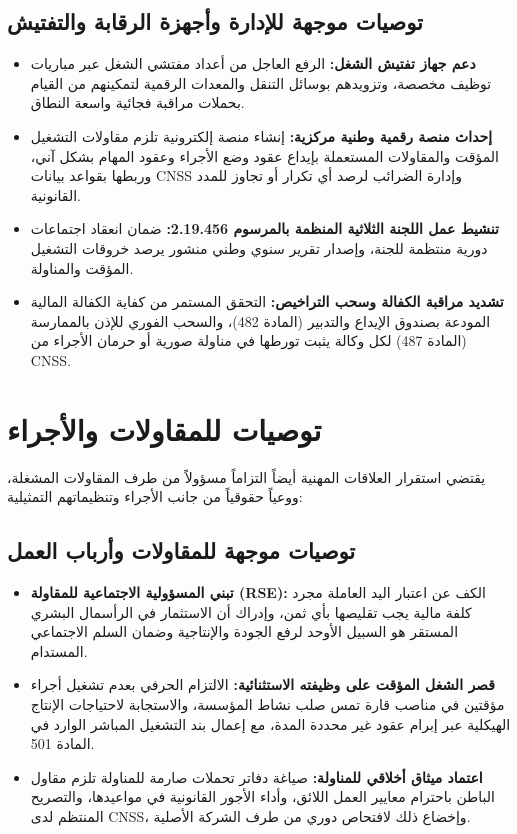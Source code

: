 \subsection{توصيات موجهة للإدارة وأجهزة الرقابة والتفتيش}
\begin{itemize}[leftmargin=*, itemsep=6pt]
    \item \textbf{دعم جهاز تفتيش الشغل:} الرفع العاجل من أعداد مفتشي الشغل عبر مباريات توظيف مخصصة، وتزويدهم بوسائل التنقل والمعدات الرقمية لتمكينهم من القيام بحملات مراقبة فجائية واسعة النطاق.
    \item \textbf{إحداث منصة رقمية وطنية مركزية:} إنشاء منصة إلكترونية تلزم مقاولات التشغيل المؤقت والمقاولات المستعملة بإيداع عقود وضع الأجراء وعقود المهام بشكل آني، وربطها بقواعد بيانات \textenglish{CNSS} وإدارة الضرائب لرصد أي تكرار أو تجاوز للمدد القانونية.
    \item \textbf{تنشيط عمل اللجنة الثلاثية المنظمة بالمرسوم \textenglish{2.19.456}:} ضمان انعقاد اجتماعات دورية منتظمة للجنة، وإصدار تقرير سنوي وطني منشور يرصد خروقات التشغيل المؤقت والمناولة.
    \item \textbf{تشديد مراقبة الكفالة وسحب التراخيص:} التحقق المستمر من كفاية الكفالة المالية المودعة بصندوق الإيداع والتدبير (المادة \textenglish{482})، والسحب الفوري للإذن بالممارسة (المادة \textenglish{487}) لكل وكالة يثبت تورطها في مناولة صورية أو حرمان الأجراء من \textenglish{CNSS}.
\end{itemize}

\section{توصيات للمقاولات والأجراء}

يقتضي استقرار العلاقات المهنية أيضاً التزاماً مسؤولاً من طرف المقاولات المشغلة، ووعياً حقوقياً من جانب الأجراء وتنظيماتهم التمثيلية:

\subsection{توصيات موجهة للمقاولات وأرباب العمل}
\begin{itemize}[leftmargin=*, itemsep=6pt]
    \item \textbf{تبني المسؤولية الاجتماعية للمقاولة (\textenglish{RSE}):} الكف عن اعتبار اليد العاملة مجرد كلفة مالية يجب تقليصها بأي ثمن، وإدراك أن الاستثمار في الرأسمال البشري المستقر هو السبيل الأوحد لرفع الجودة والإنتاجية وضمان السلم الاجتماعي المستدام.
    \item \textbf{قصر الشغل المؤقت على وظيفته الاستثنائية:} الالتزام الحرفي بعدم تشغيل أجراء مؤقتين في مناصب قارة تمس صلب نشاط المؤسسة، والاستجابة لاحتياجات الإنتاج الهيكلية عبر إبرام عقود غير محددة المدة، مع إعمال بند التشغيل المباشر الوارد في المادة \textenglish{501}.
    \item \textbf{اعتماد ميثاق أخلاقي للمناولة:} صياغة دفاتر تحملات صارمة للمناولة تلزم مقاول الباطن باحترام معايير العمل اللائق، وأداء الأجور القانونية في مواعيدها، والتصريح المنتظم لدى \textenglish{CNSS}، وإخضاع ذلك لافتحاص دوري من طرف الشركة الأصلية.
\end{itemize}


